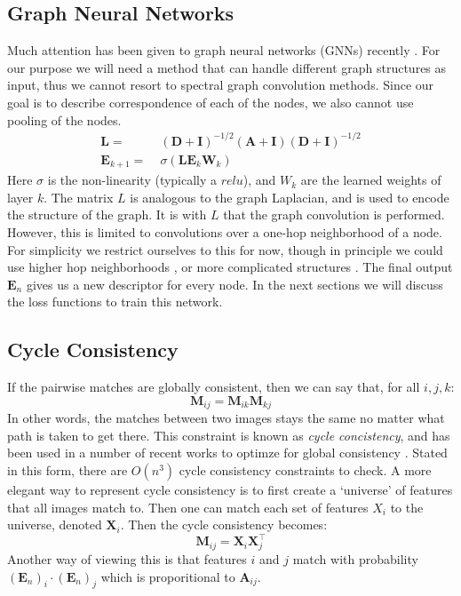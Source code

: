 \documentclass[10pt,twocolumn,letterpaper]{article}
\newcommand{\mat}[1]{\mathbf{#1}}
\begin{document}
\subsection{Graph Neural Networks}
Much attention has been given to graph neural networks (GNNs) recently
\cite{bronstein2017geometric, bruna2013spectral, defferrard2016convolutional, kipf2016semi, scarselli2009graph, gama2018mimo, gama2018convolutional, battaglia2018relational}.
For our purpose we will need a method that can handle different graph structures as input, thus we cannot resort to spectral graph convolution methods.
Since our goal is to describe correspondence of each of the nodes, we also cannot use pooling of the nodes.
\begin{align}
      \mat{L} =&\; (\mat{D} + \mat{I})^{-1/2} (\mat{A} + \mat{I}) (\mat{D} + \mat{I})^{-1/2} \\
\mat{E}_{k+1} =&\; \sigma\left(\mat{L} \mat{E}_k \mat{W}_k \right)
\end{align}
Here $\sigma$ is the non-linearity (typically a $relu$), and $W_k$ are the learned weights of layer $k$. 
The matrix $L$ is analogous to the graph Laplacian, and is used to encode the structure of the graph.
It is with $L$ that the graph convolution is performed.
However, this is limited to convolutions over a one-hop neighborhood of a node.
For simplicity we restrict ourselves to this for now, though in principle we could use higher hop neighborhoods \cite{gama2018convolutional}, or more complicated structures \cite{battaglia2018relational}.
The final output $\mat{E}_n$ gives us a new descriptor for every node.
In the next sections we will discuss the loss functions to train this network.

\subsection{Cycle Consistency}
If the pairwise matches are globally consistent, then we can say that, for all $i, j, k$:
\begin{equation}
\mat{M}_{ij} = \mat{M}_{ik} \mat{M}_{kj}
\label{eq:cycconsist1}
\end{equation}
In other words, the matches between two images stays the same no matter what path is taken to get there. 
This constraint is known as \textit{cycle concistency}, and has been used in a number of recent works to optimze for global consistency \cite{zhou2015multi, wang2017multi, leonardos2016distributed}.
Stated in this form, there are $O(n^3)$ cycle consistency constraints to check.
A more elegant way to represent cycle consistency is to first create a `universe' of features that all images match to.
Then one can match each set of features $X_i$ to the universe, denoted $\mat{X}_i$.
Then the cycle consistency becomes:
\begin{equation}
\mat{M}_{ij} = \mat{X}_{i}\mat{X}_{j}^\top
\label{eq:cycconsist2}
\end{equation}
Another way of viewing this is that features $i$ and $j$ match with probability $(\mat{E}_n)_i \cdot (\mat{E}_n)_j$ which is proporitional to $\mat{A}_{ij}$.
\end{document}
